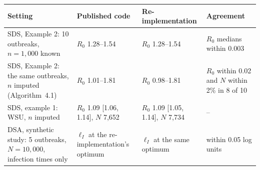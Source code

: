 \begin{tabular}{p{} p{} p{} p{}}
\toprule
Setting & Published code & Re-implementation & Agreement \\
\midrule
SDS, Example 2: 10 outbreaks, $n=1{,}000$ known & $R_0$ 1.28--1.54 & $R_0$ 1.28--1.54 & $R_0$ medians within 0.003 \\
SDS, Example 2: the same outbreaks, $n$ imputed (Algorithm~4.1) & $R_0$ 1.01--1.81 & $R_0$ 0.98--1.81 & $R_0$ within 0.02 and $N$ within 2\% in 8 of 10 \\
SDS, example 1: WSU, $n$ imputed & $R_0$ 1.09 [1.06, 1.14], $N$ 7{,}652 & $R_0$ 1.09 [1.05, 1.14], $N$ 7{,}734 & -- \\
DSA, synthetic study: 5 outbreaks, $N=10{,}000$, infection times only & $\ell_I$ at the re-implementation's optimum & $\ell_I$ at the same optimum & within 0.05 log units \\
\bottomrule
\end{tabular}
